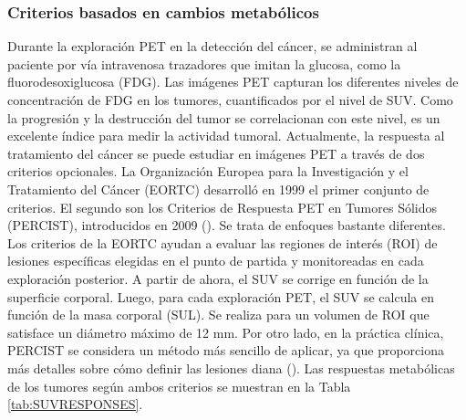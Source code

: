 \documentclass[11pt,a4paper,openany]{article}
\begin{document}
        
        \subsubsection{Criterios basados en cambios metabólicos}
        Durante la exploración PET en la detección del cáncer, se administran al paciente por vía intravenosa trazadores que imitan la glucosa, como la fluorodesoxiglucosa (FDG). Las imágenes PET capturan los diferentes niveles de concentración de FDG en los tumores, cuantificados por el nivel de SUV. Como la progresión y la destrucción del tumor se correlacionan con este nivel, es un excelente índice para medir la actividad tumoral. Actualmente, la respuesta al tratamiento del cáncer se puede estudiar en imágenes PET a través de dos criterios opcionales. La Organización Europea para la Investigación y el Tratamiento del Cáncer (EORTC) desarrolló en 1999 el primer conjunto de criterios. El segundo son los Criterios de Respuesta PET en Tumores Sólidos (PERCIST), introducidos en 2009 (\cite{Kim2016}). Se trata de enfoques bastante diferentes. Los criterios de la EORTC ayudan a evaluar las regiones de interés (ROI) de lesiones específicas elegidas en el punto de partida y monitoreadas en cada exploración posterior. A partir de ahora, el SUV se corrige en función de la superficie corporal. Luego, para cada exploración PET, el SUV se calcula en función de la masa corporal (SUL). Se realiza para un volumen de ROI que satisface un diámetro máximo de 12 mm. Por otro lado, en la práctica clínica, PERCIST se considera un método más sencillo de aplicar, ya que proporciona más detalles sobre cómo definir las lesiones diana (\cite{Skougaard2013}). Las respuestas metabólicas de los tumores según ambos criterios se muestran en la Tabla \ref{tab:SUVRESPONSES}.
\end{document}
